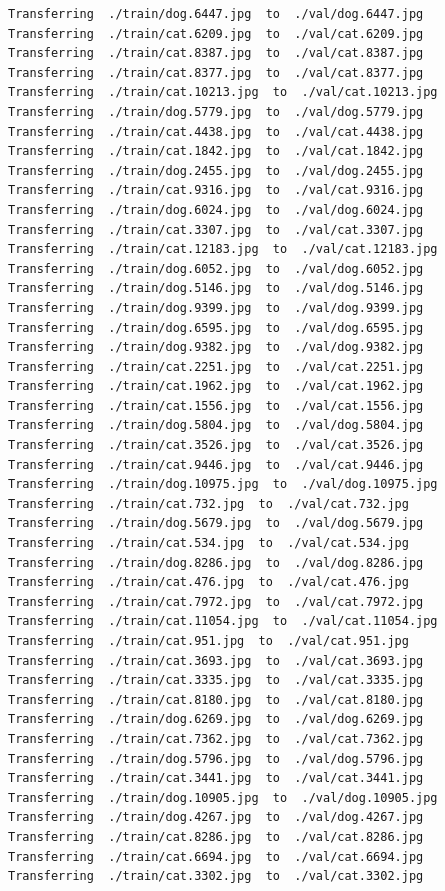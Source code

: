 \documentclass[]{book}
\theoremstyle{definition}
\theoremstyle{definition}
\theoremstyle{definition}
\theoremstyle{remark}
\begin{document}
\begin{verbatim}
Transferring  ./train/dog.6447.jpg  to  ./val/dog.6447.jpg
Transferring  ./train/cat.6209.jpg  to  ./val/cat.6209.jpg
Transferring  ./train/cat.8387.jpg  to  ./val/cat.8387.jpg
Transferring  ./train/cat.8377.jpg  to  ./val/cat.8377.jpg
Transferring  ./train/cat.10213.jpg  to  ./val/cat.10213.jpg
Transferring  ./train/dog.5779.jpg  to  ./val/dog.5779.jpg
Transferring  ./train/cat.4438.jpg  to  ./val/cat.4438.jpg
Transferring  ./train/cat.1842.jpg  to  ./val/cat.1842.jpg
Transferring  ./train/dog.2455.jpg  to  ./val/dog.2455.jpg
Transferring  ./train/cat.9316.jpg  to  ./val/cat.9316.jpg
Transferring  ./train/dog.6024.jpg  to  ./val/dog.6024.jpg
Transferring  ./train/cat.3307.jpg  to  ./val/cat.3307.jpg
Transferring  ./train/cat.12183.jpg  to  ./val/cat.12183.jpg
Transferring  ./train/dog.6052.jpg  to  ./val/dog.6052.jpg
Transferring  ./train/dog.5146.jpg  to  ./val/dog.5146.jpg
Transferring  ./train/dog.9399.jpg  to  ./val/dog.9399.jpg
Transferring  ./train/dog.6595.jpg  to  ./val/dog.6595.jpg
Transferring  ./train/dog.9382.jpg  to  ./val/dog.9382.jpg
Transferring  ./train/cat.2251.jpg  to  ./val/cat.2251.jpg
Transferring  ./train/cat.1962.jpg  to  ./val/cat.1962.jpg
Transferring  ./train/cat.1556.jpg  to  ./val/cat.1556.jpg
Transferring  ./train/dog.5804.jpg  to  ./val/dog.5804.jpg
Transferring  ./train/cat.3526.jpg  to  ./val/cat.3526.jpg
Transferring  ./train/cat.9446.jpg  to  ./val/cat.9446.jpg
Transferring  ./train/dog.10975.jpg  to  ./val/dog.10975.jpg
Transferring  ./train/cat.732.jpg  to  ./val/cat.732.jpg
Transferring  ./train/dog.5679.jpg  to  ./val/dog.5679.jpg
Transferring  ./train/cat.534.jpg  to  ./val/cat.534.jpg
Transferring  ./train/dog.8286.jpg  to  ./val/dog.8286.jpg
Transferring  ./train/cat.476.jpg  to  ./val/cat.476.jpg
Transferring  ./train/cat.7972.jpg  to  ./val/cat.7972.jpg
Transferring  ./train/cat.11054.jpg  to  ./val/cat.11054.jpg
Transferring  ./train/cat.951.jpg  to  ./val/cat.951.jpg
Transferring  ./train/cat.3693.jpg  to  ./val/cat.3693.jpg
Transferring  ./train/cat.3335.jpg  to  ./val/cat.3335.jpg
Transferring  ./train/cat.8180.jpg  to  ./val/cat.8180.jpg
Transferring  ./train/dog.6269.jpg  to  ./val/dog.6269.jpg
Transferring  ./train/cat.7362.jpg  to  ./val/cat.7362.jpg
Transferring  ./train/dog.5796.jpg  to  ./val/dog.5796.jpg
Transferring  ./train/cat.3441.jpg  to  ./val/cat.3441.jpg
Transferring  ./train/dog.10905.jpg  to  ./val/dog.10905.jpg
Transferring  ./train/dog.4267.jpg  to  ./val/dog.4267.jpg
Transferring  ./train/cat.8286.jpg  to  ./val/cat.8286.jpg
Transferring  ./train/cat.6694.jpg  to  ./val/cat.6694.jpg
Transferring  ./train/cat.3302.jpg  to  ./val/cat.3302.jpg

\end{verbatim}
\end{document}
